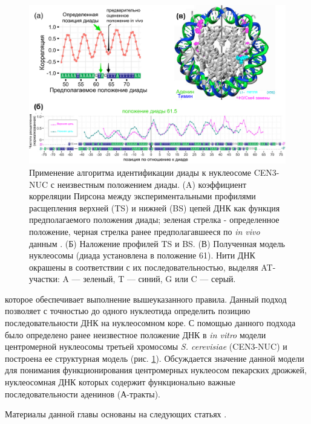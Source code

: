\begin{figure}[H]
    \centering
    \includegraphics[width=\textwidth]{images/p5/part5_2_nar/p5_2_f8.pdf}
    \caption[Применение алгоритма идентификации диады  к нуклеосоме CEN3-NUC с неизвестным положением диады.]{Применение алгоритма идентификации диады к нуклеосоме CEN3-NUC с неизвестным положением диады. (A) коэффициент корреляции Пирсона между экспериментальными профилями расщепления верхней (TS) и нижней (BS) цепей ДНК как функция предполагаемого положения диады; зеленая стрелка - определенное положение, черная стрелка ранее предполагавшееся по \textit{in vivo} данным \cite{cole_centromeric_2011}. (Б) Наложение профилей TS и BS. (В) Полученная модель нуклеосомы (диада установлена в положение 61). Нити ДНК окрашены в соответствии с их последовательностью, выделяя AT-участки: A –– зеленый, T –– синий, G или C –– серый.}
    \label{fig:p5:p5_2_f8}
\end{figure}


\noindent
 которое обеспечивает выполнение вышеуказанного правила. Данный подход позволяет с точностью до одного нуклеотида определить позицию последовательности ДНК на нуклеосомном коре. С помощью данного подхода было определено ранее неизвестное положение ДНК в \textit{in vitro} модели центромерной нуклеосомы третьей хромосомы \textit{S. cerevisiae} (CEN3-NUC) и построена ее структурная модель (рис. \ref{fig:p5:p5_2_f8}). Обсуждается значение данной модели для понимания функционирования центромерных нуклеосом пекарских дрожжей, нуклеосомная ДНК которых содержит функционально важные последовательности аденинов (А-тракты). 





Материалы данной главы основаны на следующих статьях \cite{shaytan_hydroxyl-radical_2017,shaytan_structural_2018,armeev_modeling_2016}.

